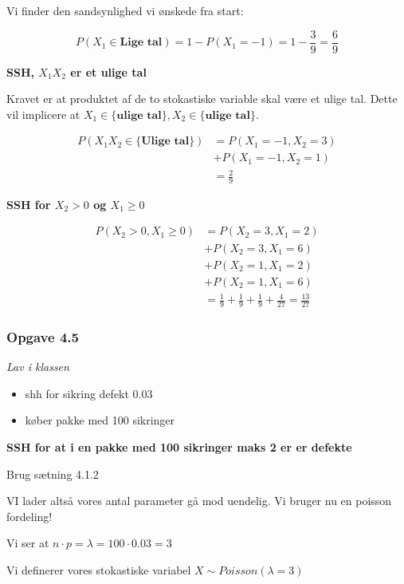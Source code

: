 Vi finder den sandsynlighed vi ønskede fra start:

\begin{equation}
    P(X_1 \in \textbf{Lige tal}) = 1 - P(X_{1}=-1) = 1 - \frac{3}{9} = \frac{6}{9}
\end{equation}


\textbf{SSH, $X_{1}X_{2}$ er et ulige tal}

Kravet er at produktet af de to stokastiske variable skal være et ulige tal. Dette vil implicere at $X_1 \in \{\textbf{ulige tal}\}, X_2 \in \{\textbf{ulige tal}\}$. 

\begin{align}
    P(X_1X_2 \in \{\textbf{Ulige tal}\}) &= P(X_1 = -1, X_2 = 3) \\
    &+ P(X_1 = -1, X_2 = 1) \\
    &= \frac{2}{9} 
\end{align}

\textbf{SSH for $X_2>0$ og $X_1 \geq 0$}

\begin{align}
    P(X_2>0, X_1\geq 0) &= 
    P(X_2 = 3, X_1 = 2) \\
    &+ P(X_2 = 3, X_1 = 6) \\
    &+ P(X_2 = 1, X_1 = 2) \\
    &+ P(X_2 = 1, X_1 = 6) \\
    &= \frac{1}{9} + \frac{1}{9} + \frac{1}{9} + \frac{4}{27} = \frac{13}{27}
\end{align}

\subsubsection{Opgave 4.5}

\textit{Lav i klassen}

\begin{itemize}
    \item shh for sikring defekt 0.03
    \item køber pakke med 100 sikringer
\end{itemize}

\textbf{SSH for at i en pakke med 100 sikringer maks 2 er er defekte
}

Brug sætning 4.1.2

VI lader altså vores antal parameter gå mod uendelig. Vi bruger nu en poisson fordeling!

Vi ser at $n\cdot p = \lambda = 100 \cdot 0.03 = 3$

Vi definerer vores stokastiske variabel $X \sim Poisson(\lambda = 3)$

